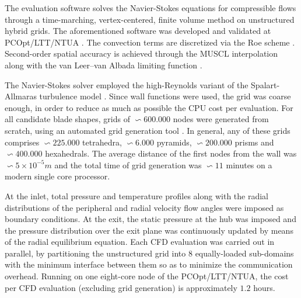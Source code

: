 The evaluation software solves the Navier-Stokes equations for compressible flows through a time-marching, vertex-centered, finite volume method on unstructured hybrid grids. The aforementioned software was developed and validated at PCOpt/LTT/NTUA \cite{phd_Vera,phd_Kampolis}. The convection terms are discretized via the Roe scheme \cite{Roe81}. Second-order spatial accuracy is achieved through the MUSCL interpolation \cite{vleer:muscl} along with the van Leer--van Albada limiting function \cite{valbada:82}. 

The Navier-Stokes solver employed the high-Reynolds variant of the Spalart-Allmaras turbulence model \cite{phd_Kampolis}. Since wall functions were used, the grid was coarse enough, in order to reduce as much as possible the CPU cost per evaluation. For all candidate blade shapes, grids of $\backsim \! 600.000$ nodes were generated from scratch, using an automated grid generation tool \cite{phd_Kampolis}. In general, any of these grids comprises $\backsim \! 225.000$ tetrahedra, $\backsim \! 6.000$ pyramids, $\backsim \! 200.000$ prisms and $\backsim \! 400.000$ hexahedrals. The average distance of the first nodes from the wall was $\backsim \! 5\times10^{-5}m$ and the total time of grid generation was $\backsim \! 11$ minutes on a modern single core processor. 

At the inlet, total pressure and temperature profiles along with the radial distributions of the peripheral and radial velocity flow angles were imposed as boundary conditions. At the exit, the static pressure at the hub was imposed and the pressure distribution over the exit plane was continuously updated by means of the radial equilibrium equation. 
Each CFD evaluation was carried out in parallel, by partitioning the unstructured grid into $8$ equally-loaded sub-domains with the minimum interface between them so as to minimize the communication overhead. Running on one eight-core node of the PCOpt/LTT/NTUA, the cost per CFD evaluation (excluding grid generation) is approximately $1.2$ hours. 






